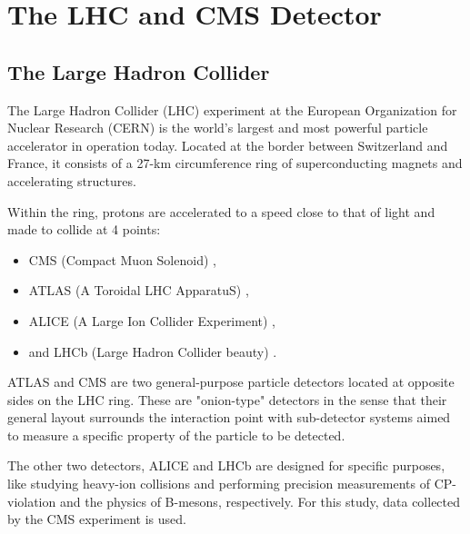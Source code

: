 %
%
%
%

\chapter{The LHC and CMS Detector}
\section{The Large Hadron Collider}

The Large Hadron Collider (LHC) \cite{Breskin:1244506} experiment at the European Organization for Nuclear Research (CERN) is the world's largest and most powerful particle accelerator in operation today. Located at the border between Switzerland and France, it consists of a 27-km circumference ring of superconducting magnets and accelerating structures.

Within the ring, protons are accelerated to a speed close to that of light and made to collide at 4 points:

\begin{itemize}
\item CMS (Compact Muon Solenoid) \cite{Chatrchyan:2008aa},
\item ATLAS (A Toroidal LHC ApparatuS) \cite{1748-0221-3-08-S08003},
\item ALICE (A Large Ion Collider Experiment) \cite{Aamodt:2008zz},
\item and LHCb (Large Hadron Collider beauty) \cite{Alves:2008zz}.
\end{itemize}

ATLAS and CMS are two general-purpose particle detectors located at opposite sides on the LHC ring. These are "onion-type" detectors in the sense that their general layout surrounds the interaction point with sub-detector systems aimed to measure a specific property of the particle to be detected.

The other two detectors, ALICE and LHCb are designed for specific purposes, like studying heavy-ion collisions and performing precision measurements of CP-violation and the physics of B-mesons, respectively. For this study, data collected by the CMS experiment is used.

